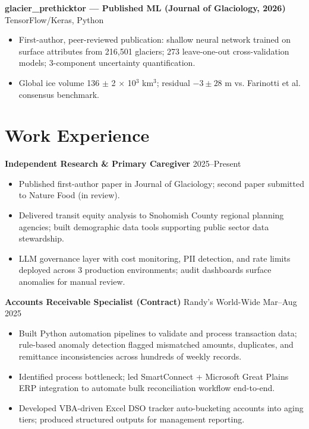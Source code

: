\documentclass[11pt,a4paper]{article}
\begin{document}
\vspace{0.2cm}
\noindent
\textbf{glacier\_prethicktor --- Published ML (Journal of Glaciology, 2026)} \hfill TensorFlow/Keras, Python
\begin{itemize}
    \item First-author, peer-reviewed publication: shallow neural network trained on surface attributes from 216,501 glaciers; 273 leave-one-out cross-validation models; 3-component uncertainty quantification.
    \item Global ice volume 136 $\pm$ 2 $\times$ 10$^3$ km$^3$; residual $-3 \pm 28$ m vs. Farinotti et al. consensus benchmark.
\end{itemize}

\section*{Work Experience}

\noindent
\textbf{Independent Research \& Primary Caregiver} \hfill 2025--Present
\begin{itemize}
    \item Published first-author paper in Journal of Glaciology; second paper submitted to Nature Food (in review).
    \item Delivered transit equity analysis to Snohomish County regional planning agencies; built demographic data tools supporting public sector data stewardship.
    \item LLM governance layer with cost monitoring, PII detection, and rate limits deployed across 3 production environments; audit dashboards surface anomalies for manual review.
\end{itemize}

\vspace{0.2cm}
\noindent
\textbf{Accounts Receivable Specialist (Contract)} \hfill Randy's World-Wide \hfill Mar--Aug 2025
\begin{itemize}
    \item Built Python automation pipelines to validate and process transaction data; rule-based anomaly detection flagged mismatched amounts, duplicates, and remittance inconsistencies across hundreds of weekly records.
    \item Identified process bottleneck; led SmartConnect + Microsoft Great Plains ERP integration to automate bulk reconciliation workflow end-to-end.
    \item Developed VBA-driven Excel DSO tracker auto-bucketing accounts into aging tiers; produced structured outputs for management reporting.
\end{itemize}
\end{document}
